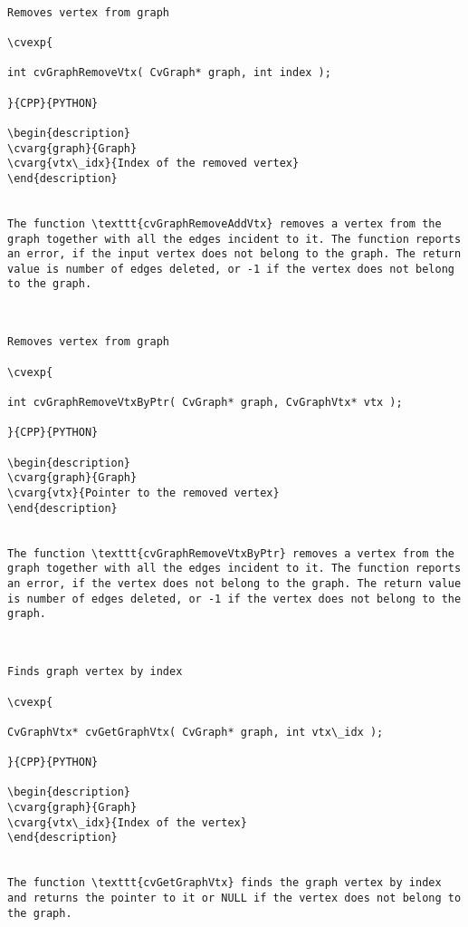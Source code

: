 \begin{verbatim}

Removes vertex from graph

\cvexp{

int cvGraphRemoveVtx( CvGraph* graph, int index );

}{CPP}{PYTHON}

\begin{description}
\cvarg{graph}{Graph}
\cvarg{vtx\_idx}{Index of the removed vertex}
\end{description}


The function \texttt{cvGraphRemoveAddVtx} removes a vertex from the graph together with all the edges incident to it. The function reports an error, if the input vertex does not belong to the graph. The return value is number of edges deleted, or -1 if the vertex does not belong to the graph.


\end{verbatim}
\begin{verbatim}

Removes vertex from graph

\cvexp{

int cvGraphRemoveVtxByPtr( CvGraph* graph, CvGraphVtx* vtx );

}{CPP}{PYTHON}

\begin{description}
\cvarg{graph}{Graph}
\cvarg{vtx}{Pointer to the removed vertex}
\end{description}


The function \texttt{cvGraphRemoveVtxByPtr} removes a vertex from the graph together with all the edges incident to it. The function reports an error, if the vertex does not belong to the graph. The return value is number of edges deleted, or -1 if the vertex does not belong to the graph.


\end{verbatim}
\begin{verbatim}

Finds graph vertex by index

\cvexp{

CvGraphVtx* cvGetGraphVtx( CvGraph* graph, int vtx\_idx );

}{CPP}{PYTHON}

\begin{description}
\cvarg{graph}{Graph}
\cvarg{vtx\_idx}{Index of the vertex}
\end{description}


The function \texttt{cvGetGraphVtx} finds the graph vertex by index and returns the pointer to it or NULL if the vertex does not belong to the graph.


\end{verbatim}
